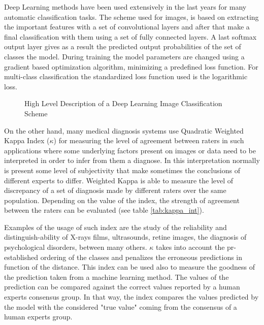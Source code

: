 \documentclass{IOS-Book-Article}
\begin{document}
Deep Learning methods have been used extensively in the last years for many automatic classification tasks. The scheme used for images, is based on extracting the important features with a set of convolutional layers and after that make a final classification with them using a set of fully connected layers. A last softmax output layer gives as a result the predicted output probabilities of the set of classes the model. During training the model parameters are changed using a gradient based optimization algorithm, minimizing a predefined loss function. For multi-class classification the standardized loss function used is the logarithmic loss.

\begin{figure}
	\caption{High Level Description of a Deep Learning Image Classification Scheme}
	\centering
\end{figure}

On the other hand, many medical diagnosis systems use Quadratic Weighted Kappa Index ($\kappa$) for measuring the level of agreement between raters in such applications where some underlying factors present on images or data need to be interpreted in order to infer from them a diagnose. In this interpretation normally is present some level of subjectivity that make sometimes the conclusions of different experts to differ. Weighted Kappa is able to measure the level of discrepancy of a set of diagnosis made by different raters over the same population. Depending on the value of the index, the strength of agreement between the raters can be evaluated (see table \ref{tab:kappa_int}). 

Examples of the usage of such index are the study of the reliability and distinguish-ability of X-rays films, ultrasounds, retine images, the diagnosis of psychological disorders, between many others. $\kappa$ takes into account the pr-established ordering of the classes and penalizes the erroneous predictions in function of the distance. This index can be used also to measure the goodness of the prediction taken from a machine learning method. The values of the prediction can be compared against the correct values reported by a human experts consensus group. In that way, the index compares the values predicted by the model with the considered "true value" coming from the consensus of a human experts group.
\end{document}
